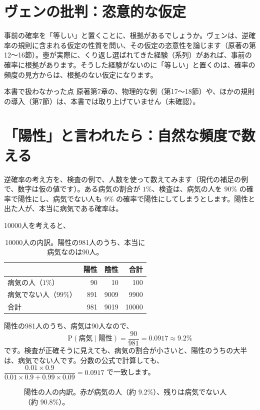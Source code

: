 \documentclass[a4paper,11pt,openany]{ltjsbook}
\newcommand{\Prob}{\mathrm{P}}
\begin{document}
\section{ヴェンの批判：恣意的な仮定}

事前の確率を「等しい」と置くことに、根拠があるでしょうか。ヴェンは、逆確率の規則に含まれる仮定の性質を問い、その仮定の恣意性を論じます（原著の第12〜16節）。壺が実際に、くり返し選ばれてきた経験（系列）があれば、事前の確率に根拠があります。そうした経験がないのに「等しい」と置くのは、確率の頻度の見方からは、根拠のない仮定になります。

\begin{notebox}{本書で扱わなかった点}
原著第7章の、物理的な例（第17〜18節）や、ほかの規則の導入（第7節）は、本書では取り上げていません（未確認）。
\end{notebox}

\section{「陽性」と言われたら：自然な頻度で数える}

逆確率の考え方を、検査の例で、人数を使って数えてみます（現代の補足の例で、数字は仮の値です）。ある病気の割合が $1\%$、検査は、病気の人を $90\%$ の確率で陽性にし、病気でない人も $9\%$ の確率で陽性にしてしまうとします。陽性と出た人が、本当に病気である確率は。

10000人を考えると、

\begin{table}[htbp]
\centering
\begin{tabular}{lrrr}
\toprule
 & 陽性 & 陰性 & 合計\\
\midrule
病気の人（$1\%$） & 90 & 10 & 100\\
病気でない人（$99\%$） & 891 & 9009 & 9900\\
\midrule
合計 & 981 & 9019 & 10000\\
\bottomrule
\end{tabular}
\caption{10000人の内訳。陽性の981人のうち、本当に病気なのは90人。}
\end{table}

陽性の981人のうち、病気は90人なので、
\[
\Prob(\text{病気}\mid\text{陽性})=\frac{90}{981}=0.0917\approx9.2\%
\]
です。検査が正確そうに見えても、病気の割合が小さいと、陽性のうちの大半は、病気でない人です。分数の公式で計算しても、$\dfrac{0.01\times0.9}{0.01\times0.9+0.99\times0.09}=0.0917$ で一致します。

\begin{figure}[htbp]
\centering
{}
\caption{陽性の人の内訳。赤が病気の人（約 $9.2\%$）、残りは病気でない人（約 $90.8\%$）。}
\end{figure}
\end{document}
